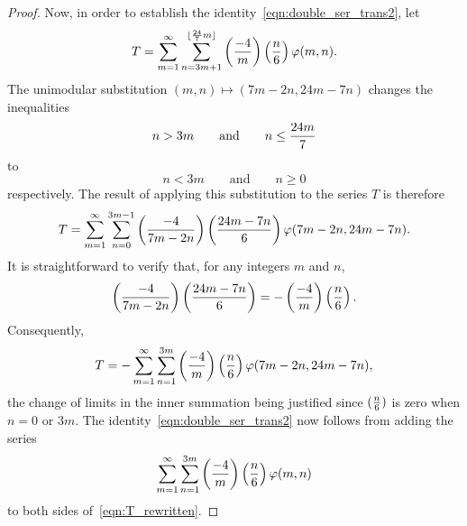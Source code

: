 \documentclass[10pt,a4paper]{amsart}
\begin{document}
\begin{proof}
Now, in order to establish the identity~\eqref{eqn:double_ser_trans2}, let
\[ T= \sum_{m=1}^\infty \sum_{n=3m+1}^{\lfloor {24 \over 7}m \rfloor} \left({-4 \over m}\right) \left({n \over 6}\right) \varphi(m,n). \]
The unimodular substitution $(m,n) \mapsto (7m-2n,24m-7n)$ changes the inequalities
\[ n > 3m \qquad \text{and} \qquad n \leq {24m \over 7} \]
to
\[ n < 3m \qquad \text{and} \qquad n \geq 0 \]
respectively. 
The result of applying this substitution to the series $T$ is therefore
\[ T = \sum_{m=1}^\infty \sum_{n=0}^{3m-1} \left({-4 \over 7m-2n}\right) \left({24m-7n \over 6}\right) \varphi(7m-2n,24m-7n). \]
It is straightforward to verify that, for any integers $m$ and $n$,
\[ \left({-4 \over 7m-2n}\right) \left({24m-7n \over 6}\right) = -\left({-4 \over m}\right) \left({n \over 6}\right). \]
Consequently,
\begin{equation} \label{eqn:T_rewritten}
T = -\sum_{m=1}^\infty \sum_{n=1}^{3m} \left({-4 \over m}\right) \left({n \over 6}\right) \varphi(7m-2n,24m-7n),
\end{equation}
the change of limits in the inner summation being justified since $({n\over6})$ is zero when $n=0$ or $3m$. 
The identity~\eqref{eqn:double_ser_trans2} now follows from adding the series
\[ \sum_{m=1}^\infty \sum_{n=1}^{3m} \left({-4 \over m}\right) \left({n \over 6}\right) \varphi(m,n) \]
to both sides of~\eqref{eqn:T_rewritten}.
\end{proof}
\end{document}
